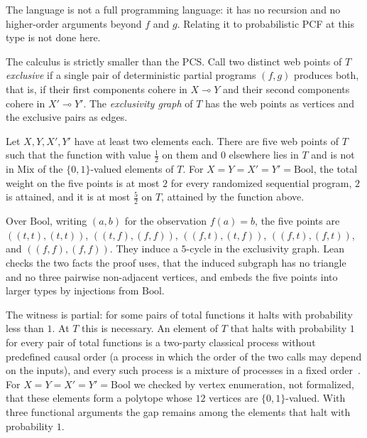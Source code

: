 \noindent The
language is not a full programming language: it has no recursion and no
higher-order arguments beyond $f$ and $g$. Relating it to probabilistic
PCF at this type is not done here.

The calculus is strictly smaller than the PCS. Call two distinct web
points of $T$ \emph{exclusive} if a single pair of deterministic partial
programs $(f, g)$ produces both, that is, if their first components
cohere in $X \multimap Y$ and their second components cohere in
$X' \multimap Y'$. The \emph{exclusivity graph} of $T$ has the web points
as vertices and the exclusive pairs as edges.

\begin{theorem}
\label{thm:pentagon}
Let $X, Y, X', Y'$ have at least two elements each. There are five web
points of $T$ such that the function with value $\tfrac12$ on them and
$0$ elsewhere lies in $T$ and is not in $\mathrm{Mix}$ of the
$\{0,1\}$-valued elements of $T$. For $X = Y = X' = Y' = \mathrm{Bool}$, the total weight on the five
points is at most $2$ for every randomized sequential program, $2$ is
attained, and it is at most $\tfrac52$ on $T$, attained by the function
above.
\end{theorem}

\noindent
Over $\mathrm{Bool}$, writing $(a,b)$ for the observation $f(a) = b$, the
five points are $((t,t),(t,t))$, $((t,f),(f,f))$, $((f,t),(t,f))$,
$((f,t),(f,t))$, and $((f,f),(f,f))$. They induce a $5$-cycle in the
exclusivity graph. Lean checks the two facts the proof uses, that the
induced subgraph has no triangle and no three pairwise non-adjacent
vertices, and
embeds the five points into larger types by injections from
$\mathrm{Bool}$.

The witness is partial: for some pairs of total functions it halts with
probability less than $1$. At $T$ this is necessary. An element of $T$
that halts with probability $1$ for every pair of total functions is a
two-party classical process without predefined causal order (a process
in which the order of the two calls may depend on the inputs), and every
such process is a mixture of processes in a fixed
order~\cite{baumeler-wolf2016}. For $X = Y = X' = Y' = \mathrm{Bool}$ we
checked by vertex enumeration, not formalized, that these elements form a
polytope whose $12$ vertices are $\{0,1\}$-valued. With three functional
arguments the gap remains among the elements that halt with probability
$1$.

